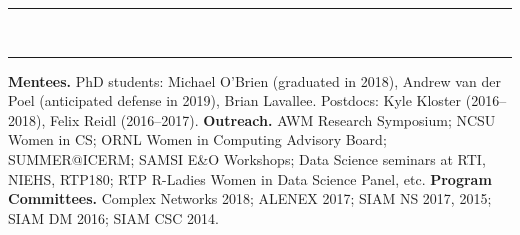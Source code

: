 \documentclass[10pt]{article}
\newcommand{\heading}[1]{
  \vfill
  \vspace{0.2cm}
  \hrule height .2mm  \vspace{1mm}
  \noindent {\large \textbf{#1}}\\ \vspace{-3mm} \hrule height .2mm
  \vspace{0.3cm}
}
\begin{document}
\heading{Service}
\begin{small}
\noindent \textbf{Mentees.} PhD students: Michael O'Brien (graduated in 2018), Andrew van der Poel (anticipated defense in 2019), Brian Lavallee. Postdocs: Kyle Kloster (2016--2018), Felix Reidl (2016--2017).
\vskip 0.1cm
\noindent \textbf{Outreach.}  AWM Research Symposium;  NCSU Women in CS; ORNL Women in Computing Advisory Board; SUMMER@ICERM; SAMSI E\&O Workshops; Data Science seminars at RTI, NIEHS, RTP180; RTP R-Ladies Women in Data Science Panel, etc.
\vskip 0.1cm
\noindent \textbf{Program Committees.} Complex Networks 2018; ALENEX 2017; SIAM NS 2017, 2015; SIAM DM 2016; SIAM CSC 2014.
\end{small}
\end{document}
